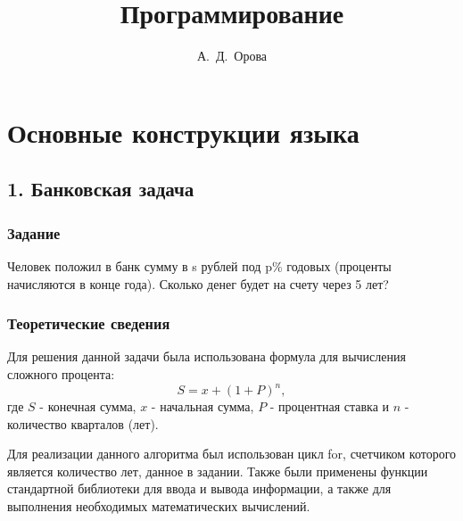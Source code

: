 \documentclass[12pt,a4paper]{report}
\author{А.~Д.~Орова}
\title{Программирование}
\begin{document}
\maketitle
\tableofcontents{}

\chapter{Основные конструкции языка}
\section{1. Банковская задача}
\subsection{Задание}
\hspace{\parindent}
Человек положил в банк сумму в s рублей под p\% годовых (проценты начисляются в конце года). Сколько денег будет на счету через 5 лет? 

\subsection{Теоретические сведения}
\hspace{\parindent}
Для решения данной задачи была использована формула для вычисления сложного процента: \begin{displaymath} S = x + (1 + P)^{n},  \end{displaymath} где $S$ - конечная сумма, $x$ - начальная сумма, $P$ - процентная ставка и $n$ - количество кварталов (лет).

Для реализации данного алгоритма был использован цикл for, счетчиком которого является количество лет, данное в задании. Также были применены функции стандартной библиотеки для ввода и вывода информации, а также для выполнения необходимых математических вычислений.
\end{document}
